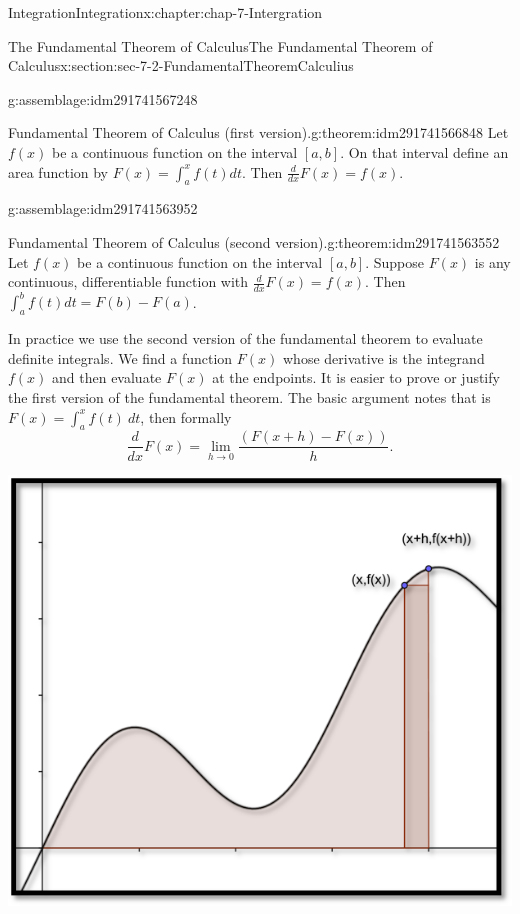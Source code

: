 \documentclass[oneside,10pt,]{book}
\numberwithin{equation}{section}
\begin{document}
\begin{chapterptx}{Integration}{}{Integration}{}{}{x:chapter:chap-7-Intergration}
\begin{sectionptx}{The Fundamental Theorem of Calculus}{}{The Fundamental Theorem of Calculus}{}{}{x:section:sec-7-2-FundamentalTheoremCalculius}
\begin{assemblage}{}{g:assemblage:idm291741567248}%
\begin{theorem}{Fundamental Theorem of Calculus (first version).}{}{g:theorem:idm291741566848}%
Let \(f(x)\) be a continuous function on the interval \([a, b]\).  On that interval define an area function by \(F(x)=\int_a^x f(t)  dt\). Then \(\frac{d}{dx} F(x)=f(x)\).\end{theorem}
%
\end{assemblage}
\begin{assemblage}{}{g:assemblage:idm291741563952}%
\begin{theorem}{Fundamental Theorem of Calculus (second version).}{}{g:theorem:idm291741563552}%
Let \(f(x)\) be a continuous function on the interval \([a, b]\).  Suppose \(F(x)\) is any continuous,  differentiable function with \(\frac{d}{dx} F(x)=f(x)\).  Then \(\int_a^b f(t) dt=F(b)-F(a)\).\end{theorem}
%
\end{assemblage}
In practice we use the second version of the fundamental theorem to evaluate definite integrals.  We find a function \(F(x)\) whose derivative is the integrand \(f(x)\) and then evaluate \(F(x)\) at the endpoints. It is easier to prove or justify the first version of the fundamental theorem.  The basic argument notes that is \(F(x)=\int_a^xf(t) \ dt\), then formally%
%
\begin{equation*}
\frac{d}{dx} F(x)=\lim_{h\to 0}
\frac{(F(x+h)-F(x))}{h}.
\end{equation*}
\begin{sidebyside}{1}{0.15}{0.15}{0}%
\begin{sbspanel}{0.7}%
\includegraphics[width=\linewidth]{images/sec7-2-9.png}

\end{sbspanel}
\end{sidebyside}
\end{sectionptx}
\end{chapterptx}
\end{document}
